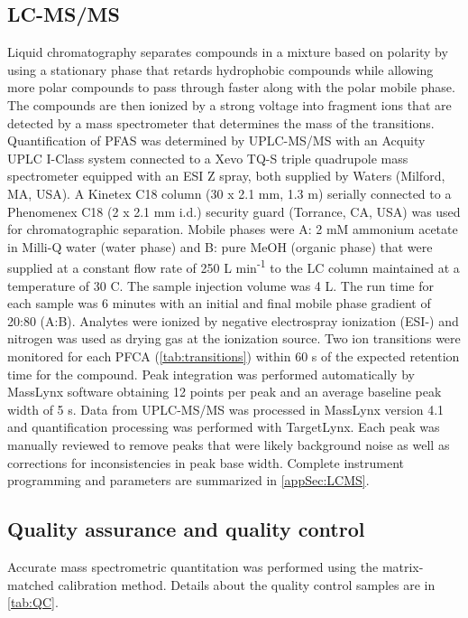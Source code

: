 \subsection{LC-MS/MS}
Liquid chromatography separates compounds in a mixture based on polarity by using a stationary phase that retards hydrophobic compounds while allowing more polar compounds to pass through faster along with the polar mobile phase. The compounds are then ionized by a strong voltage into fragment ions that are detected by a mass spectrometer that determines the mass of the transitions. Quantification of PFAS was determined by UPLC-MS/MS with an Acquity UPLC I-Class system connected to a Xevo TQ-S triple quadrupole mass spectrometer equipped with an ESI Z spray, both supplied by Waters (Milford, MA, USA). A Kinetex C18 column (30 x 2.1 mm, 1.3 \textmu m) serially connected to a Phenomenex C18 (2 x 2.1 mm i.d.) security guard (Torrance, CA, USA) was used for chromatographic separation. Mobile phases were A: 2 mM ammonium acetate in Milli-Q water (water phase) and B: pure MeOH (organic phase) that were supplied at a constant flow rate of 250 \textmu L min\textsuperscript{-1} to the LC column maintained at a temperature of 30 \textdegree C. The sample injection volume was 4 \textmu L. The run time for each sample was 6 minutes with an initial and final mobile phase gradient of 20:80 (A:B). Analytes were ionized by negative electrospray ionization (ESI-) and nitrogen was used as drying gas at the ionization source. Two ion transitions were monitored for each PFCA (\cref{tab:transitions}) within 60 s of the expected retention time for the compound. Peak integration was performed automatically by MassLynx software obtaining 12 points per peak and an average baseline peak width of 5 s. Data from UPLC-MS/MS was processed in MassLynx version 4.1 and quantification processing was performed with TargetLynx. Each peak was manually reviewed to remove peaks that were likely background noise as well as corrections for inconsistencies in peak base width. Complete instrument programming and parameters are summarized in \cref{appSec:LCMS}.



\subsection{Quality assurance and quality control}
Accurate mass spectrometric quantitation was performed using the matrix-matched calibration method. Details about the quality control samples are in \cref{tab:QC}.

